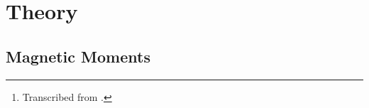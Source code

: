 \maketitle%

\begin{abstract}
\noindent
In this experiment, the barrier to rotation in  can be determined by measuring changes in \NMR* line shapes as a function of temperature. This study is an example of dynamic NMR spectroscopy (spectroscopy on a changing system, as opposed to a static one).\thanks{Transcribed from \textcite{nibler14,gasparro77}.}
\end{abstract}

\section{Theory} %
\label{sec:theory}

\subsection{Magnetic Moments} %
\label{sub:magnetic_moments}

